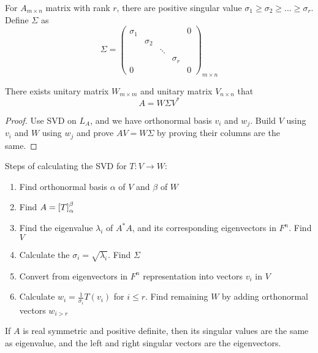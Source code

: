 \begin{theorem}
    For $A_{m \times n}$ matrix with rank $r$, there are positive singular value $\sigma_1 \geq \sigma_2 \geq ... \geq \sigma_r$. Define $\Sigma$ as
    \begin{equation}
        \Sigma = \begin{pmatrix}
            \sigma_1 & & & & 0 \\
             & \sigma_2 \\
             &  & \ddots &  \\
             &  &  &\sigma_r \\
            0 & & &  & 0
        \end{pmatrix}_{m \times n}
    \end{equation}
    
    There exists unitary matrix $W_{m \times m}$ and unitary matrix $V_{n \times n}$ that
    \begin{equation}
        A = W \Sigma V^*
    \end{equation}
\end{theorem}
\begin{proof}
    Use SVD on $L_A$, and we have orthonormal basis $v_i$ and $w_j$. Build $V$ using $v_i$ and $W$ using $w_j$ and prove $AV = W \Sigma$ by proving their columns are the same.
\end{proof}

Steps of calculating the SVD for $T:V \rightarrow W$:
\begin{enumerate}
    \item Find orthonormal basis $\alpha$ of $V$ and $\beta$ of $W$
    \item Find $A = \coordinate{T}_\alpha^\beta$
    \item Find the eigenvalue $\lambda_i$ of $A^*A$, and its corresponding eigenvectors in $F^n$. Find $V$
    \item Calculate the $\sigma_i = \sqrt{\lambda_i}$. Find $\Sigma$
    \item Convert from eigenvectors in $F^n$ representation into vectors $v_i$ in $V$
    \item Calculate $\displaystyle w_i = \frac{1}{\sigma_i} T(v_i)$ for $i \leq r$. Find remaining $W$ by adding orthonormal vectors $w_{i > r}$
\end{enumerate}

\begin{theorem}
    If $A$ is real symmetric and positive definite, then its singular values are the same as eigenvalue, and the left and right singular vectors are the eigenvectors.    
\end{theorem}


